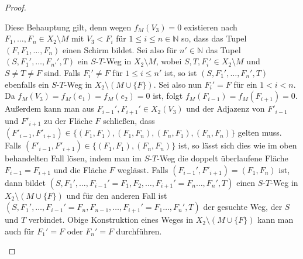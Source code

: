 \documentclass[12pt,titlepage,twoside,cleardoublepage]{article}
\theoremstyle{nummermitklammern}
\numberwithin{equation}{section}
\begin{document}
\begin{proof}
\begin{itemize}
 Diese Behauptung gilt, denn wegen $f_M(V_3)=0$ existieren nach  $F_1,\ldots,F_n \in X_2\setminus M$ mit $V_3 <F_i$ für $1 \leq i \leq n \in \mathbb{N}$ so, dass das Tupel $(F,F_1,\ldots,F_n)$ einen Schirm bildet.
  Sei also für $n' \in \mathbb{N}$ das Tupel
   $(S,F_1',\ldots ,F_{n'}',T)$ ein $S$-$T$-Weg in $X_2 \setminus M$, wobei $S,T,F_i' \in X_2\setminus M$ und $S\neq T \neq F$ sind. 
  Falls $F_i' \neq F$ für $1 \leq i \leq n'$ ist, so ist $(S,F_1',\ldots,F_n',T)$ ebenfalls ein $S$-$T$-Weg in $X_2\setminus (M \cup \{F\})$.
   Sei also nun $F_i'=F$ für ein $1 < i < n$. Da $f_M(V_3)=f_M(e_1)=f_M(e_2)=0$ ist, folgt $f_M(F_{i-1})=f_M(F_{i+1})=0$. Außerdem kann man aus $F_{i-1}',F_{i+1}' \in X_2(V_3)$ und der Adjazenz von $F'_{i-1}$ und $F'_{i+1}$ zu der Fläche $F$ schließen, dass $(F'_{i-1},F'_{i+1}) \in \{(F_1,F_1),(F_1,F_n),(F_n,F_1),(F_n,F_n)\}$ gelten muss. Falls $(F'_{i-1},F'_{i+1}) \in \{(F_1,F_1),(F_n,F_n)\}$ ist, so lässt sich dies wie im oben behandelten Fall lösen, indem man im $S$-$T$-Weg die doppelt überlaufene Fläche $F_{i-1}=F_{i+1}$ und die Fläche $F$ weglässt. Falls $(F_{i-1}',F'_{i+1})=(F_1,F_n)$ ist, dann bildet $(S,F_1',\ldots,F_{i-1}'=F_1,F_2, \ldots,F_{i+1}'=F_n\ldots,F_n',T)$ einen $S$-$T$-Weg in $X_2\setminus (M \cup \{F\})$ und für den anderen Fall ist $(S,F_1',\ldots,F_{i-1}'=F_n,F_{n-1}, \ldots,F_{i+1}'=F_1\ldots,F_n',T)$ der gesuchte Weg, der $S$ und $T$ verbindet. Obige Konstruktion eines Weges in $X_2 \setminus (M \cup \{F\})$ kann man auch für $F_1'=F$ oder $F_n'=F$ durchführen. 
   

\end{itemize}
\end{proof}
\end{document}
